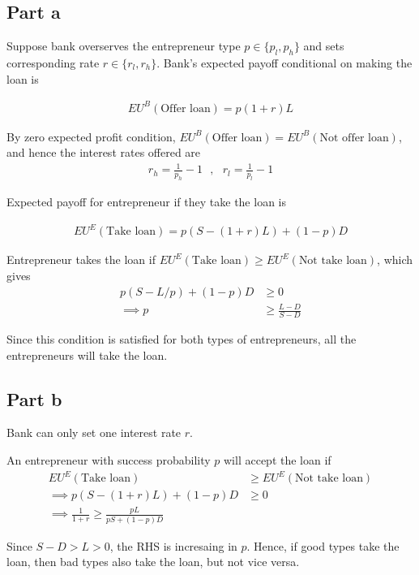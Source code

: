 \subsection*{Part a}

Suppose bank overserves the entrepreneur type $p \in \{p_l, p_h\}$ and sets corresponding rate $r \in \{r_l, r_h\}$. Bank's expected payoff conditional on making the loan is 

\begin{align*}
    EU^B(\text{Offer loan}) = p (1+r) L
\end{align*}

By zero expected profit condition, $EU^B(\text{Offer loan}) = EU^B(\text{Not offer loan})$, and hence the interest rates offered are 
\begin{align*}
    r_h = \frac{1}{p_h} - 1~~~, ~~~ r_l = \frac{1}{p_l} - 1
\end{align*}

Expected payoff for entrepreneur if they take the loan is 

\begin{align*}
    EU^E(\text{Take loan})  = p(S - (1+r)L) + (1-p)D
\end{align*}

Entrepreneur takes the loan if $EU^E(\text{Take loan}) \ge EU^E(\text{Not take loan}) $, which gives 
\begin{align*}
    p(S - L/p) + (1-p)D &\ge 0 \\
    \implies p &\ge \frac{L-D}{S-D}
\end{align*}

Since this condition is satisfied for both types of entrepreneurs, all the entrepreneurs will take the loan.

\subsection*{Part b}

Bank can only set one interest rate $r$. 

An entrepreneur with success probability $p$ will accept the loan if 
\begin{align*}
    EU^E(\text{Take loan}) &\ge EU^E(\text{Not take loan}) \\
    \implies p(S - (1+r)L) + (1-p)D &\ge 0\\
    \implies \frac{1}{1+r} \ge \frac{p L}{p S + (1-p)D}
\end{align*}

Since $S-D > L > 0$, the RHS is incresaing in $p$. Hence, if good types take the loan, then bad types also take the loan, but not vice versa.

